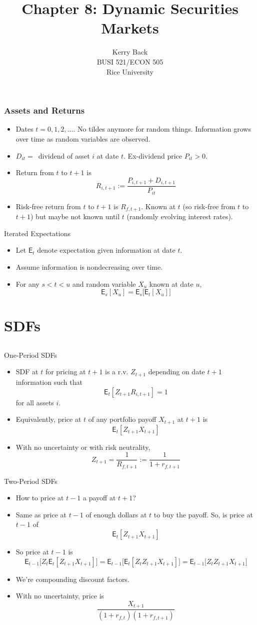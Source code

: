 \documentclass[10pt]{beamer}
\title{Chapter 8: Dynamic Securities Markets}
\date{}
\author{Kerry Back\\ 
BUSI 521/ECON 505\\
Rice University}
\newcommand{\bi}{\begin{itemize}}
\newcommand{\ei}{\end{itemize}}
\newcommand{\im}{\item}
\newcommand{\mye}{\ensuremath{\mathsf{E}}}
\newcommand{\bfr}{\begin{frame}}
\begin{document}
\maketitle


\bfr\frametitle{Assets and Returns}
\bi \im Dates $t=0,1,2,\ldots$.  No tildes anymore for random things.  Information grows over time as random variables are observed.
 \im 
$D_{it}=\,$ dividend of asset $i$ at date $t$.
 Ex-dividend price $P_{it}>0$.  
 \im 
Return from $t$ to $t+1$ is
$$R_{i,t+1} := \frac{P_{i,t+1}+D_{i,t+1}}{P_{it}}$$

\im Risk-free return from $t$ to $t+1$ is $R_{f,t+1}$.  Known at $t$ (so risk-free from $t$ to $t+1$) but maybe not known until $t$ (randomly evolving interest rates).
\ei
\end{frame}

\begin{frame}{Iterated Expectations}
    \bi 
    \im Let $\mye_t$ denote expectation given information at date $t$.
    \im Assume information is nondecreasing over time.
    \im For any $s<t<u$ and random variable $X_u$ known at date $u$,
    $$\mye_s[X_u] = \mye_s\bigg[ \mye_t[X_u]\bigg]$$
    \ei
 \end{frame}

\section{SDFs}\subsection{}

\begin{frame}{One-Period SDFs}

\bi 
\im SDF at $t$ for pricing at $t+1$ is a r.v. $Z_{t+1}$ depending on date $t+1$ information such that
$$\mye_t[Z_{t+1}R_{i, t+1}] = 1$$
for all assets $i$.
\im Equivalently, price at $t$ of any portfolio payoff $X_{t+1}$ at $t+1$ is
$$\mye_t[Z_{t+1}X_{t+1}]$$
\im With no uncertainty or with risk neutrality,
$$Z_{t+1} = \frac{1}{R_{f, t+1}} := \frac{1}{1+r_{f, t+1}}$$
\ei
\end{frame}

\begin{frame}{Two-Period SDFs}
\bi 
\im How to price at $t-1$ a payoff at $t+1$?
\pause 
\im Same as price at $t-1$ of enough dollars at $t$ to buy the payoff.  So, is price at $t-1$ of 
$$\mye_t[Z_{t+1}X_{t+1}]$$
\pause 
\im So price at $t-1$ is
$$\mye_{t-1}\bigg[Z_t\mye_t[Z_{t+1}X_{t+1}]\bigg] = \mye_{t-1}\bigg[\mye_t[Z_tZ_{t+1}X_{t+1}]\bigg] = \mye_{t-1}\bigg[Z_tZ_{t+1}X_{t+1}\bigg]$$
\im We're compounding discount factors. 
\im With no uncertainty, price is 
$$\frac{X_{t+1}}{(1+r_{f,t})(1+r_{f,t+1})}$$
\ei
\end{frame}
\end{document}
